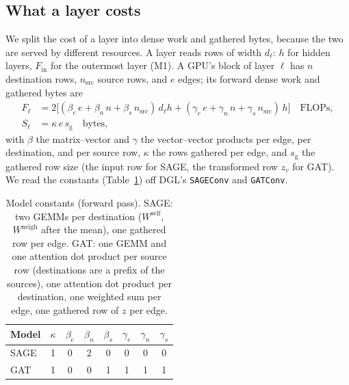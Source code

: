 \subsection{What a layer costs}
\label{sec:cm-node}

We split the cost of a layer into dense work and gathered bytes, because the two are served by
different resources. A layer reads rows of width $d_\ell$: $h$ for hidden layers, $F_{\mathrm{in}}$ for the outermost
layer (M1). A GPU's block of layer $\ell$ has $n$ destination rows, $n_{\mathrm{src}}$ source rows,
and $e$ edges; its forward dense work and gathered bytes are
\begin{align}
  F_\ell &= 2\big[(\beta_e\, e + \beta_n\, n + \beta_s\, n_{\mathrm{src}})\, d_\ell h
              + (\gamma_e\, e + \gamma_n\, n + \gamma_s\, n_{\mathrm{src}})\, h\big]
       \quad\text{FLOPs}, \label{eq:dense-cost}\\
  S_\ell &= \kappa\, e\, s_{\mathrm{g}} \quad\text{bytes,} \label{eq:sparse-cost}
\end{align}
with $\beta$ the matrix--vector and $\gamma$ the vector--vector products per edge, per destination,
and per source row, $\kappa$ the rows gathered per edge, and $s_{\mathrm{g}}$ the gathered row size
(the input row for SAGE, the transformed row $z_v$ for GAT). We read the constants
(Table~\ref{tab:cm-constants}) off DGL's \texttt{SAGEConv} and \texttt{GATConv}.

\begin{table}[h]
\centering
\caption{Model constants (forward pass). SAGE: two GEMMs per destination ($W^{\mathrm{self}}$,
$W^{\mathrm{neigh}}$ after the mean), one gathered row per edge. GAT: one GEMM and one attention
dot product per source row (destinations are a prefix of the sources), one attention dot product
per destination, one weighted sum per edge, one gathered row of $z$ per edge.}
\label{tab:cm-constants}
\small
\begin{tabular}{l c c c c c c c}
\toprule
Model & $\kappa$ & $\beta_e$ & $\beta_n$ & $\beta_s$ & $\gamma_e$ & $\gamma_n$ & $\gamma_s$ \\
\midrule
SAGE & 1 & 0 & 2 & 0 & 0 & 0 & 0 \\
GAT  & 1 & 0 & 0 & 1 & 1 & 1 & 1 \\
\bottomrule
\end{tabular}
\end{table}

